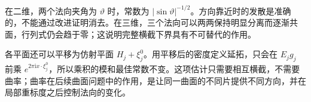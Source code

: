 在二维，两个法向夹角为 \(\vartheta\) 时，常数为
\(|\sin\vartheta|^{-1/2}\)。方向靠近时的发散是准确的，不能通过改进证明消去。在三维，三个法向可以两两保持明显分离而逐渐共面，行列式仍会趋于零；这说明完整横截下界具有不可替代的作用。

\ProseParagraphBreak

各平面还可以平移为仿射平面 \(H_j+\xi_j^0\)。用平移后的密度定义延拓，只会在 \(E_jg_j\) 前乘
\(e^{2\pi\mathrm i x\cdot\xi_j^0}\)，所以乘积的模和最佳常数不变。这项估计只需要相互横截，不需要曲率；曲率在后续曲面问题中的作用，是让同一曲面的不同片提供不同方向，并在局部重标度之后控制法向的变化。
